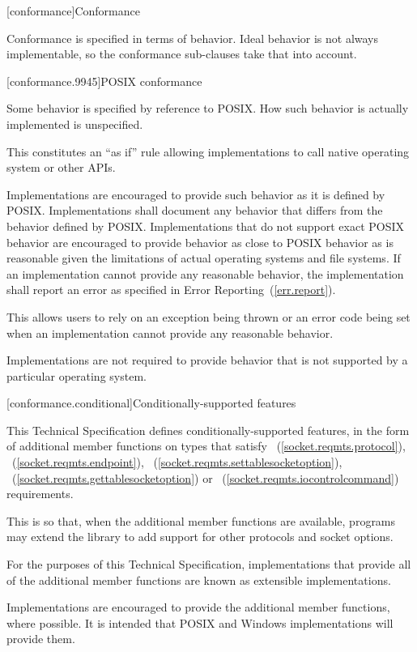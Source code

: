 
[conformance]{Conformance}

\pnum
 Conformance is specified in terms of behavior. Ideal behavior is not always implementable, so the conformance sub-clauses take that into account.


[conformance.9945]{POSIX conformance}

\pnum
 Some behavior is specified by reference to POSIX. How such behavior is actually implemented is unspecified.

\pnum
 \enternote This constitutes an ``as if'' rule allowing implementations to call native operating system or other APIs. \exitnote

\pnum
Implementations are encouraged to provide such behavior as it is defined by POSIX. Implementations shall document any behavior that differs from the behavior defined by POSIX. Implementations that do not support exact POSIX behavior are encouraged to provide behavior as close to POSIX behavior as is reasonable given the limitations of actual operating systems and file systems. If an implementation cannot provide any reasonable behavior, the implementation shall report an error as specified in Error Reporting~(\ref{err.report}).

\pnum
 \enternote This allows users to rely on an exception being thrown or an error code being set when an implementation cannot provide any reasonable behavior. \exitnote

\pnum
 Implementations are not required to provide behavior that is not supported by a particular operating system.



[conformance.conditional]{Conditionally-supported features}

\pnum
This Technical Specification defines conditionally-supported features, in the form of additional member functions on types that satisfy ~(\ref{socket.reqmts.protocol}), ~(\ref{socket.reqmts.endpoint}), ~(\ref{socket.reqmts.settablesocketoption}), ~(\ref{socket.reqmts.gettablesocketoption}) or ~(\ref{socket.reqmts.iocontrolcommand}) requirements.

\pnum
 \enternote This is so that, when the additional member functions are available, \Cpp programs may extend the library to add support for other protocols and socket options. \exitnote

\pnum
For the purposes of this Technical Specification, implementations that provide all of the additional member functions are known as extensible implementations.

\pnum
 \enternote Implementations are encouraged to provide the additional member functions, where possible. It is intended that POSIX and Windows implementations will provide them. \exitnote




